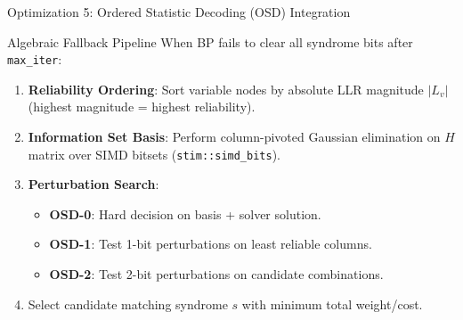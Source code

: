 \begin{frame}{Optimization 5: Ordered Statistic Decoding (OSD) Integration}
    \begin{block}{Algebraic Fallback Pipeline}
        When BP fails to clear all syndrome bits after \texttt{max\_iter}:
        \begin{enumerate}
            \item \textbf{Reliability Ordering}: Sort variable nodes by absolute LLR magnitude $|L_v|$ (highest magnitude = highest reliability).
            \item \textbf{Information Set Basis}: Perform column-pivoted Gaussian elimination on $H$ matrix over SIMD bitsets (\texttt{stim::simd\_bits}).
            \item \textbf{Perturbation Search}:
                  \begin{itemize}
                      \item \textbf{OSD-0}: Hard decision on basis + solver solution.
                      \item \textbf{OSD-1}: Test 1-bit perturbations on least reliable columns.
                      \item \textbf{OSD-2}: Test 2-bit perturbations on candidate combinations.
                  \end{itemize}
            \item Select candidate matching syndrome $s$ with minimum total weight/cost.
        \end{enumerate}
    \end{block}
\end{frame}
